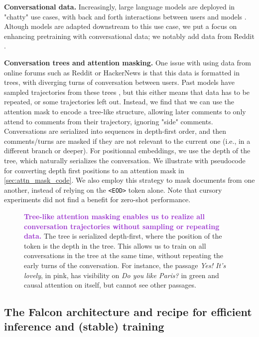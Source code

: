 \documentclass{article}
\DeclareRobustCommand{\data}[1]{\textcolor{DarkOrchid}{#1}}
\begin{document}
\textbf{Conversational data.} Increasingly, large language models are deployed in "chatty" use cases, with back and forth interactions between users and models \citep{adiwardana2020towards, zheng2023judging}. Altough models are adapted downstream to this use case, we put a focus on enhancing pretraining with conversational data; we notably add data from Reddit \citep{baumgartner2020pushshift}.

\textbf{Conversation trees and attention masking.} One issue with using data from online forums such as Reddit or HackerNews is that this data is formatted in trees, with diverging turns of conversation between users. Past models have sampled trajectories from these trees \citep{thoppilan2022lamda, palm}, but this either means that data has to be repeated, or some trajectories left out. Instead, we find that we can use the attention mask to encode a tree-like structure, allowing later comments to only attend to comments from their trajectory, ignoring "side" comments. Conversations are serialized into sequences in depth-first order, and then comments/turns are masked if they are not relevant to the current one (i.e., in a different branch or deeper). For positionnal embeddings, we use the depth of the tree, which naturally serializes the conversation. We illustrate with pseudocode for converting depth first positions to an attention mask in \cref{sec:attn_mask_code}. We also employ this strategy to mask documents from one another, instead of relying on the \texttt{<EOD>} token alone. Note that cursory experiments did not find a benefit for zero-shot performance.


\begin{figure}[t]
    \centering
    
    \caption{\textbf{\data{Tree-like attention masking enables us to realize all conversation trajectories without sampling or repeating data.}} The tree is serialized depth-first, where the position of the token is the depth in the tree. This allows us to train on all conversations in the tree at the same time, without repeating the early turns of the conversation. For instance, the passage \textit{Yes! It's lovely}, in \textcolor{adaptation}{pink}, has visibility on \textit{Do you like Paris?} in \textcolor{fine-tuning-darker}{green} and causal attention on itself, but cannot see other passages.}
    \label{fig:attn_mask}
    \vspace{-0.1in}
\end{figure}


\subsection{The Falcon architecture and recipe for efficient inference and (stable) training}
\end{document}
